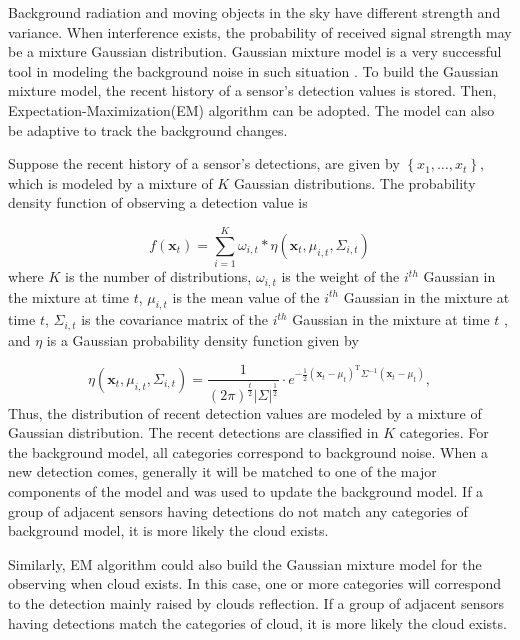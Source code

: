 Background radiation and moving objects in the sky have different
strength and variance. When interference exists, the probability of
received signal strength may be a mixture Gaussian distribution. Gaussian
mixture model is a very successful tool in modeling the background
noise in such situation \cite{Stauffer1999}. To build the Gaussian
mixture model, the recent history of a sensor's detection values is
stored. Then, Expectation-Maximization(EM) algorithm \cite{Moon1996}
can be adopted. The model can also be adaptive to track the background
changes. 

Suppose the recent history of a sensor's detections, are given by
$\left\{ x_{1},\ldots,x_{t}\right\} $, which is modeled by a mixture
of $K$ Gaussian distributions. The probability density function of
observing a detection value is

\begin{equation}
f(\mathbf{x}_{t})=\sum_{i=1}^{K}\omega_{i,t}*\eta(\mathbf{x}_{t},\mu_{i,t},\Sigma_{i,t})\label{eq:GMM density function}
\end{equation}
where $K$ is the number of distributions, $\omega_{i,t}$ is the
weight of the $i^{th}$ Gaussian in the mixture at time $t$, $\mu_{i,t}$
is the mean value of the $i^{th}$ Gaussian in the mixture at time
$t$, $\Sigma_{i,t}$ is the covariance matrix of the $i^{th}$ Gaussian
in the mixture at time $t$ , and $\eta$ is a Gaussian probability
density function given by

\begin{equation}
\eta(\mathbf{x}_{t},\mu_{i,t},\Sigma_{i,t})=\frac{1}{\left(2\pi\right)^{\frac{t}{2}}\left|\Sigma\right|^{\frac{1}{2}}}\cdot e^{-\frac{1}{2}\left(\mathbf{x}_{t}-\mu_{t}\right)^{\mathrm{T}}\Sigma^{-1}\left(\mathbf{x}_{t}-\mu_{t}\right)},
\end{equation}
Thus, the distribution of recent detection values are modeled by a
mixture of Gaussian distribution. The recent detections are classified
in $K$ categories. For the background model, all categories correspond
to background noise. When a new detection comes, generally it will
be matched to one of the major components of the model and was used
to update the background model. If a group of adjacent sensors having
detections do not match any categories of background model, it is
more likely the cloud exists. 

Similarly, EM algorithm could also build the Gaussian mixture model
for the observing when cloud exists. In this case, one or more categories
will correspond to the detection mainly raised by clouds reflection.
If a group of adjacent sensors having detections match the categories
of cloud, it is more likely the cloud exists. 

